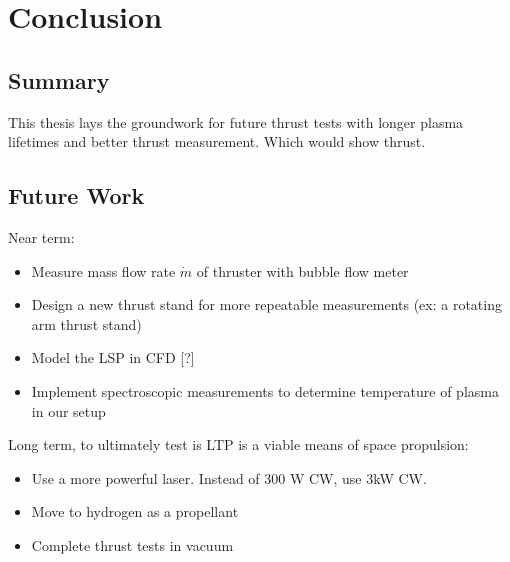 \chapter{Conclusion}

    \section{Summary}


        This thesis lays the groundwork for future thrust tests with longer plasma lifetimes and better thrust measurement. Which would show thrust.

    \section{Future Work}

        Near term:

        \begin{itemize}
            \item Measure mass flow rate $\dot m$ of thruster with bubble flow meter
            \item Design a new thrust stand for more repeatable measurements (ex: a rotating arm thrust stand)
            \item Model the LSP in CFD [?]
            \item Implement spectroscopic measurements to determine temperature of plasma in our setup
        \end{itemize}

        Long term, to ultimately test is LTP is a viable means of space propulsion:

        \begin{itemize}
            \item Use a more powerful laser. Instead of 300 W CW, use 3kW CW.
            \item Move to hydrogen as a propellant
            \item Complete thrust tests in vacuum
        \end{itemize}


        
        
        
        
        
        
        
        
 
